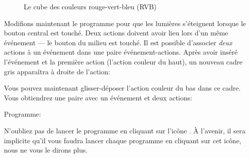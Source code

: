 \begin{figure}
\caption{Le cube des couleurs rouge-vert-bleu (RVB)}\label{fig.cube}
\end{figure}


Modifions maintenant le programme pour que les lumières s'éteignent lorsque le bouton central est touché.
Deux actions doivent avoir lieu lors d'un même événement --- le bouton du milieu est touché.
Il est possible d'associer \emph{deux} actions à un événement
dans une paire événement-actions.
Après avoir inséré l'événement et la première action (l'action couleur du haut), un nouveau cadre gris apparaîtra à droite de l'action:


Vous pouvez maintenant glisser-déposer l'action couleur du bas 
dans ce cadre.
Vous obtiendrez une paire avec un événement et deux actions:\label{p.multiple}


{\raggedleft \hfill Programme: }

N'oubliez pas de lancer le programme en cliquant sur l'icône .
À l'avenir, il sera implicite qu'il vous faudra lancer chaque programme en cliquant sur cet icône, nous ne vous le dirons plus.

\bigskip

